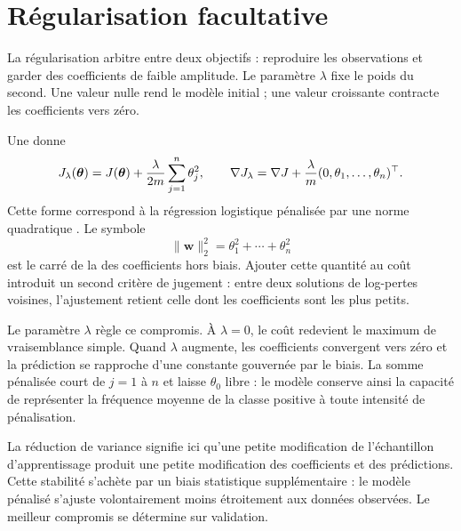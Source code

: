\section{Régularisation facultative}

\begin{lecture}
La régularisation arbitre entre deux objectifs : reproduire les observations et
garder des coefficients de faible amplitude. Le paramètre $\lambda$ fixe le poids
du second. Une valeur nulle rend le modèle initial ; une valeur croissante
contracte les coefficients vers zéro.
\end{lecture}

Une  donne
\[
  J_\lambda(\boldsymbol{\theta})=J(\boldsymbol{\theta})+\frac{\lambda}{2m}\sum_{j=1}^n\theta_j^2,
  \qquad
  \nabla J_\lambda=\nabla J+\frac{\lambda}{m}(0,\theta_1,\ldots,\theta_n)^\top.
\]
Cette forme correspond à la régression logistique pénalisée par une norme
quadratique \cite[sec.~4.4.4]{hastie2009}. Le symbole
\[
  \|\mathbf w\|_2^2=\theta_1^2+\cdots+\theta_n^2
\]
est le carré de la  des coefficients hors biais. Ajouter cette
quantité au coût introduit un second critère de jugement : entre deux solutions
de log-pertes voisines, l'ajustement retient celle dont les coefficients sont les
plus petits.

Le paramètre $\lambda$ règle ce compromis. À $\lambda=0$, le coût redevient le
maximum de vraisemblance simple. Quand $\lambda$ augmente, les coefficients
convergent vers zéro et la prédiction se rapproche d'une constante gouvernée par
le biais. La somme pénalisée court de $j=1$ à $n$ et laisse $\theta_0$ libre :
le modèle conserve ainsi la capacité de représenter la fréquence moyenne de la
classe positive à toute intensité de pénalisation.

La réduction de variance signifie ici qu'une petite modification de l'échantillon
d'apprentissage produit une petite modification des coefficients et des
prédictions. Cette stabilité s'achète par un biais statistique supplémentaire :
le modèle pénalisé s'ajuste volontairement moins étroitement aux données
observées. Le meilleur compromis se détermine sur validation.


